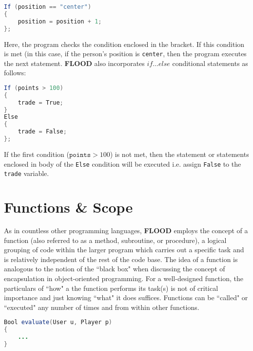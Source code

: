 \documentclass[12pt]{report}
\begin{document}
\begin{singlespace}
\begin{lstlisting}[language=Java,label=some-code,caption=If conditional]
If (position == "center")
{
	position = position + 1;
};
\end{lstlisting}
\end{singlespace}

Here, the program checks the condition enclosed in the bracket. If this condition is met (in this case, if the person's position is \texttt{center}, then the program executes the next statement. \textbf{FLOOD} also incorporates \textit{$if\ldots else$} conditional statements as follows:

\begin{singlespace}
\begin{lstlisting}[language=Java,label=some-code,caption=If...Else conditional statement]
If (points > 100)
{
	trade = True;
}
Else
{
	trade = False;
};	
\end{lstlisting}
\end{singlespace}

If the first condition ($\texttt{points} > 100$) is not met, then the statement or statements enclosed in body of the \texttt{Else} condition will be executed i.e. assign \texttt{False} to the \texttt{trade} variable.

\section{Functions \& Scope}

As in countless other programming languages, \textbf{FLOOD} employs the concept of a function (also referred to as a method, subroutine, or procedure), a logical grouping of code within the larger program which carries out a specific task and is relatively independent of the rest of the code base. The idea of a function is analogous to the notion of the ``black box" when discussing the concept of encapsulation in object-oriented programming. For a well-designed function, the particulars of ``how" a the function performs its task(s) is not of critical importance and just knowing ``what" it does suffices. Functions can be ``called" or ``executed" any number of times and from within other functions. 

\begin{singlespace}
\begin{lstlisting}[language=Java,label=some-code,caption=Syntax of a FLOOD function]
Bool evaluate(User u, Player p)
{
	...
} 
\end{lstlisting}
\end{singlespace}
\end{document}
